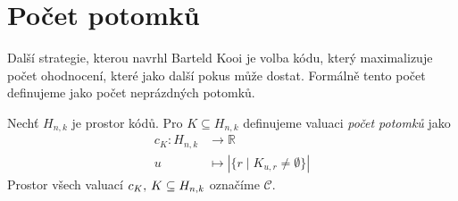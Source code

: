 












\section{Počet potomků}
Další strategie, kterou navrhl Barteld Kooi \cite{kooi} je volba kódu, který maximalizuje počet ohodnocení, které jako další pokus může dostat. Formálně tento počet definujeme jako počet neprázdných potomků.
\begin{definice}
    Nechť $H_{n,k}$ je prostor kódů. Pro $K \subseteq H_{n,k}$ definujeme valuaci \emph{počet potomků} jako
    \begin{align*}
        c_K \colon H_{n,k} &\to \mathbb{R} \\
        u &\mapsto |\{r \mid K_{u,r} \neq \emptyset\}|
    \end{align*}
    Prostor všech valuací $c_K, \hspace{2px} K \subseteq H_{n,k}$ označíme $\mathcal{C}$. 
\end{definice}

